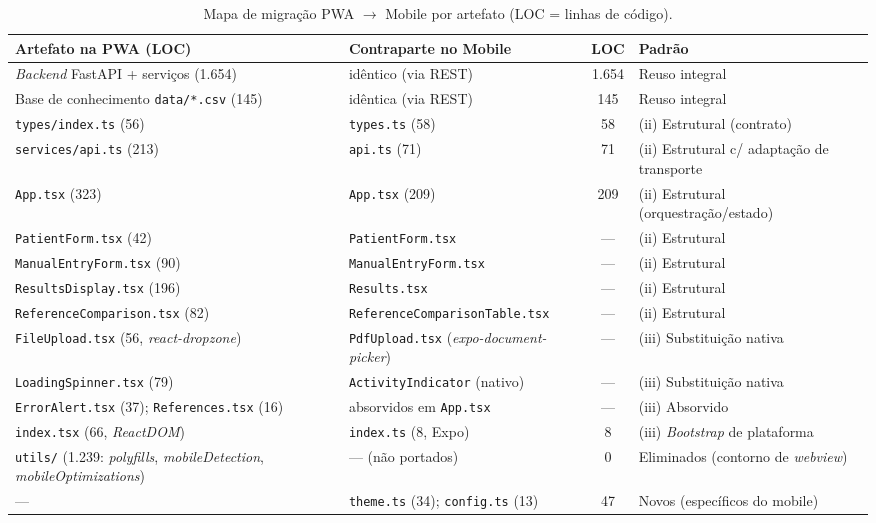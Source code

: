 \begin{table}[H]
\centering
\caption{Mapa de migração PWA $\rightarrow$ Mobile por artefato (LOC = linhas de código).}
\label{tab:mapa_migracao}
\footnotesize
\setlength{\tabcolsep}{3.5pt}
\begin{tabular}{|p{4.3cm}|p{4.0cm}|c|p{3.0cm}|}
\hline
\textbf{Artefato na PWA (LOC)} & \textbf{Contraparte no Mobile} & \textbf{LOC} & \textbf{Padrão} \\ \hline
\emph{Backend} FastAPI + serviços (1.654) & idêntico (via REST) & 1.654 & Reuso integral \\ \hline
Base de conhecimento \texttt{data/*.csv} (145) & idêntica (via REST) & 145 & Reuso integral \\ \hline
\texttt{types/index.ts} (56) & \texttt{types.ts} (58) & 58 & (ii) Estrutural (contrato) \\ \hline
\texttt{services/api.ts} (213) & \texttt{api.ts} (71) & 71 & (ii) Estrutural c/ adaptação de transporte \\ \hline
\texttt{App.tsx} (323) & \texttt{App.tsx} (209) & 209 & (ii) Estrutural (orquestração/estado) \\ \hline
\texttt{PatientForm.tsx} (42) & \texttt{PatientForm.tsx} & --- & (ii) Estrutural \\ \hline
\texttt{ManualEntryForm.tsx} (90) & \texttt{ManualEntryForm.tsx} & --- & (ii) Estrutural \\ \hline
\texttt{ResultsDisplay.tsx} (196) & \texttt{Results.tsx} & --- & (ii) Estrutural \\ \hline
\texttt{ReferenceComparison.tsx} (82) & \texttt{ReferenceComparisonTable.tsx} & --- & (ii) Estrutural \\ \hline
\texttt{FileUpload.tsx} (56, \emph{react-dropzone}) & \texttt{PdfUpload.tsx} (\emph{expo-document-picker}) & --- & (iii) Substituição nativa \\ \hline
\texttt{LoadingSpinner.tsx} (79) & \texttt{ActivityIndicator} (nativo) & --- & (iii) Substituição nativa \\ \hline
\texttt{ErrorAlert.tsx} (37); \texttt{References.tsx} (16) & absorvidos em \texttt{App.tsx} & --- & (iii) Absorvido \\ \hline
\texttt{index.tsx} (66, \emph{ReactDOM}) & \texttt{index.ts} (8, Expo) & 8 & (iii) \emph{Bootstrap} de plataforma \\ \hline
\texttt{utils/} (1.239: \emph{polyfills}, \emph{mobileDetection}, \emph{mobileOptimizations}) & --- (não portados) & 0 & Eliminados (contorno de \emph{webview}) \\ \hline
--- & \texttt{theme.ts} (34); \texttt{config.ts} (13) & 47 & Novos (específicos do mobile) \\ \hline
\end{tabular}
\end{table}

